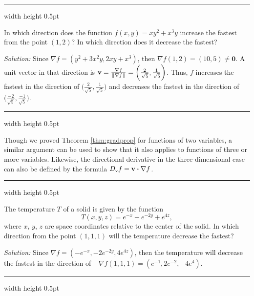 
\medskip
\hrule width \textwidth height 0.5pt
\begin{exmp}
 In which direction does the function $f(x,y) = xy^2 + x^3 y$ increase the fastest from the point $(1,2)$?
 In which direction does it decrease the fastest?\smallskip
 \par\noindent\emph{Solution:} Since $\nabla f = (y^2 + 3x^2 y, 2xy + x^3)$, then
 $\nabla f(1,2) = (10,5) \ne \mathbf{0}$. 
 A unit vector in that direction is $\mathbf{v} =
 \frac{\nabla f}{\lVert\mspace{1mu}\nabla f\mspace{1mu}\rVert} = \biggl( \frac{2}{\sqrt{5}}, \frac{1}{\sqrt{5}} \biggr)$. 
 Thus, $f$ increases the
 fastest in the direction of $\biggl( \frac{2}{\sqrt{5}}, \frac{1}{\sqrt{5}} \biggr)$ and decreases the fastest in
 the direction of $\biggl( \frac{-2}{\sqrt{5}}, \frac{-1}{\sqrt{5}} \biggr)$.
\end{exmp}
\hrule width \textwidth height 0.5pt
\medskip

Though we proved Theorem \ref{thm:gradprop} for functions of two variables, a similar argument can be used to show
that it also applies to functions of three or more variables. Likewise, the directional derivative in the
three-dimensional case can also be defined by the formula $D_{\scriptscriptstyle \mathbf{v}}f =
\mathbf{v} \bm{\cdot} \nabla f$.

\medskip
\hrule width \textwidth height 0.5pt
\begin{exmp}
 The temperature $T$ of a solid is given by the function 
 \[T(x,y,z) = e^{-x} + e^{-2y} + e^{4z},\] 
 where
 $x$, $y$, $z$ are space coordinates relative to the center of the solid. In which direction from the point $(1,1,1)$
 will the temperature decrease the fastest?\smallskip
 \par\noindent\emph{Solution:} Since $\nabla f = (-e^{-x},-2e^{-2y},4e^{4z})$, then the temperature will decrease the
 fastest in the direction of
 $-\nabla f(1,1,1) = (e^{-1},2e^{-2},-4e^4 )$.
\end{exmp}
\hrule width \textwidth height 0.5pt

